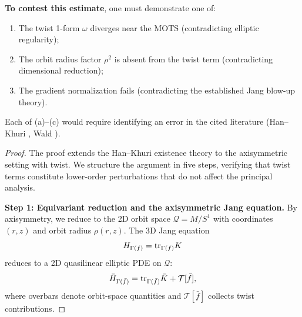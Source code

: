 \begin{remark}
\textbf{To contest this estimate}, one must demonstrate one of:
\begin{enumerate}[label=(\alph*)]
    \item The twist 1-form $\omega$ diverges near the MOTS (contradicting elliptic regularity);
    \item The orbit radius factor $\rho^2$ is absent from the twist term (contradicting dimensional reduction);
    \item The gradient normalization fails (contradicting the established Jang blow-up theory).
\end{enumerate}
Each of (a)--(c) would require identifying an error in the cited literature (Han--Khuri \cite{hankhuri2013}, Wald \cite{wald1984}).
\end{remark}
\begin{proof}
The proof extends the Han--Khuri existence theory \cite{hankhuri2013} to the axisymmetric setting with twist. We structure the argument in five steps, verifying that twist terms constitute lower-order perturbations that do not affect the principal analysis.

\textbf{Step 1: Equivariant reduction and the axisymmetric Jang equation.}
By axisymmetry, we reduce to the 2D orbit space $\mathcal{Q} = M/S^1$ with coordinates $(r, z)$ and orbit radius $\rho(r,z)$. The 3D Jang equation
\[
H_{\Gamma(f)} = \mathrm{tr}_{\Gamma(f)} K
\]
reduces to a 2D quasilinear elliptic PDE on $\mathcal{Q}$:
\begin{equation}\label{eq:reduced-jang}
\bar{H}_{\Gamma(\bar{f})} = \mathrm{tr}_{\Gamma(\bar{f})} \bar{K} + \mathcal{T}[\bar{f}],
\end{equation}
where overbars denote orbit-space quantities and $\mathcal{T}[\bar{f}]$ collects twist contributions.


\end{proof}
